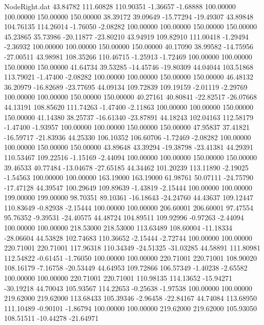 \begin{filecontents}{NodeRight.dat}
  43.84782  111.60828  110.90351    -1.36657   -1.68888  100.00000  100.00000  150.00000  150.00000   38.39172   39.09649  -15.77294  -19.49307
  43.89848  104.76135  114.26014    -1.76050   -2.08282  100.00000  100.00000  150.00000  150.00000   45.23865   35.73986  -20.11877  -23.80210
  43.94919  109.82910  111.00418    -1.29494   -2.36932  100.00000  100.00000  150.00000  150.00000   40.17090   38.99582  -14.75956  -27.00511
  43.98981  108.35266  110.46715    -1.25913   -1.72469  100.00000  100.00000  150.00000  150.00000   41.64734   39.53285  -14.45746  -19.80309
  44.04044  103.51868  113.79021    -1.47400   -2.08282  100.00000  100.00000  150.00000  150.00000   46.48132   36.20979  -16.82689  -23.77695
  44.09134  109.72839  109.19159    -2.01119   -2.29769  100.00000  100.00000  150.00000  150.00000   40.27161   40.80841  -22.82517  -26.07668
  44.13191  108.85620  111.74263    -1.47400   -2.11863  100.00000  100.00000  150.00000  150.00000   41.14380   38.25737  -16.61340  -23.87891
  44.18243  102.04163  112.58179    -1.47400   -1.93957  100.00000  100.00000  150.00000  150.00000   47.95837   37.41821  -16.59717  -21.83936
  44.25330  106.10352  106.60706    -1.72469   -2.08282  100.00000  100.00000  150.00000  150.00000   43.89648   43.39294  -19.38798  -23.41381
  44.29391  110.53467  109.22516    -1.15169   -2.44094  100.00000  100.00000  150.00000  150.00000   39.46533   40.77484  -13.04678  -27.65185
  44.34462  101.20239  113.11890    -2.19025   -1.54563  100.00000  100.00000  163.19000  163.19000   61.98761   50.07111  -24.75790  -17.47128
  44.39547  100.29649  109.89639    -1.43819   -2.15444  100.00000  100.00000  199.00000  199.00000   98.70351   89.10361  -16.18643  -24.24760
  44.43637  109.12447  110.83649    -0.82938   -2.15444  100.00000  100.00000  206.60001  206.60001   97.47554   95.76352   -9.39531  -24.40575
  44.48724  104.89511  109.92996    -0.97263   -2.44094  100.00000  100.00000  218.53000  218.53000  113.63489  108.60004  -11.18334  -28.06604
  44.53828  102.74683  110.36652    -2.15444   -2.72744  100.00000  100.00000  220.71001  220.71001  117.96318  110.34349  -24.51325  -31.03285
  44.58891  111.80981  112.54822    -0.61451   -1.76050  100.00000  100.00000  220.71001  220.71001  108.90020  108.16179   -7.16758  -20.53449
  44.64953  109.72866  106.57349    -1.40238   -2.65582  100.00000  100.00000  220.71001  220.71001  110.98135  114.13652  -15.94271  -30.19218
  44.70043  105.93567  114.22653    -0.25638   -1.97538  100.00000  100.00000  219.62000  219.62000  113.68433  105.39346   -2.96458  -22.84167
  44.74084  113.68950  111.10489    -0.90101   -1.86794  100.00000  100.00000  219.62000  219.62000  105.93050  108.51511  -10.44278  -21.64971

\end{filecontents}
